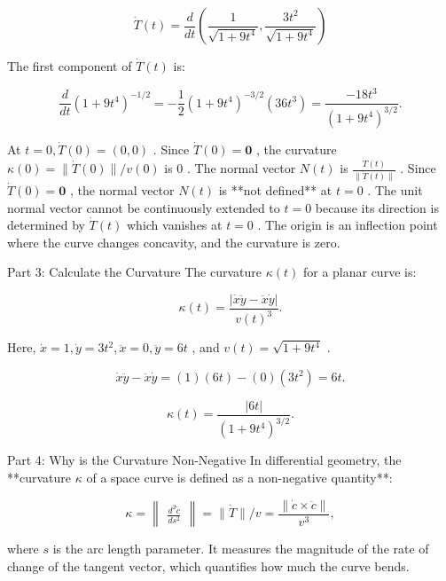 \documentclass[10pt]{article}
\begin{document}
\[
\dot{T}\left( t\right)  = \frac{d}{dt}\left( {\frac{1}{\sqrt{1 + 9{t}^{4}}},\frac{3{t}^{2}}{\sqrt{1 + 9{t}^{4}}}}\right)
\]

The first component of \(\dot{T}\left( t\right)\) is:

\[
\frac{d}{dt}{\left( 1 + 9{t}^{4}\right) }^{-1/2} =  - \frac{1}{2}{\left( 1 + 9{t}^{4}\right) }^{-3/2}\left( {{36}{t}^{3}}\right)  = \frac{-{18}{t}^{3}}{{\left( 1 + 9{t}^{4}\right) }^{3/2}}.
\]

At \(t = 0,\dot{T}\left( 0\right)  = \left( {0,0}\right)\) . Since \(\dot{T}\left( 0\right)  = \mathbf{0}\) , the curvature \(\kappa \left( 0\right)  = \parallel \dot{T}\left( 0\right) \parallel /v\left( 0\right)\) is 0 . The normal vector \(N\left( t\right)\) is \(\frac{\dot{T}\left( t\right) }{\parallel \dot{T}\left( t\right) \parallel }\) . Since \(\dot{T}\left( 0\right)  = \mathbf{0}\) , the normal vector \(N\left( t\right)\) is **not defined** at \(t = 0\) . The unit normal vector cannot be continuously extended to \(t = 0\) because its direction is determined by \(\dot{T}\left( t\right)\) which vanishes at \(t = 0\) . The origin is an inflection point where the curve changes concavity, and the curvature is zero.

Part 3: Calculate the Curvature The curvature \(\kappa \left( t\right)\) for a planar curve is:

\[
\kappa \left( t\right)  = \frac{\left| \dot{x}\ddot{y} - \ddot{x}\dot{y}\right| }{v{\left( t\right) }^{3}}.
\]

Here, \(\dot{x} = 1,\dot{y} = 3{t}^{2},\ddot{x} = 0,\ddot{y} = {6t}\) , and \(v\left( t\right)  = \sqrt{1 + 9{t}^{4}}\) .

\[
\dot{x}\ddot{y} - \ddot{x}\dot{y} = \left( 1\right) \left( {6t}\right)  - \left( 0\right) \left( {3{t}^{2}}\right)  = {6t}.
\]

\[
\kappa \left( t\right)  = \frac{\left| 6t\right| }{{\left( 1 + 9{t}^{4}\right) }^{3/2}}.
\]

Part 4: Why is the Curvature Non-Negative In differential geometry, the **curvature \(\kappa\) of a space curve is defined as a non-negative quantity**:

\[
\kappa  = \begin{Vmatrix}\frac{{d}^{2}\widetilde{c}}{d{s}^{2}}\end{Vmatrix} = \parallel \dot{T}\parallel /v = \frac{\parallel \dot{c} \times  \ddot{c}\parallel }{{v}^{3}},
\]

where \(s\) is the arc length parameter. It measures the magnitude of the rate of change of the tangent vector, which quantifies how much the curve bends.
\end{document}
